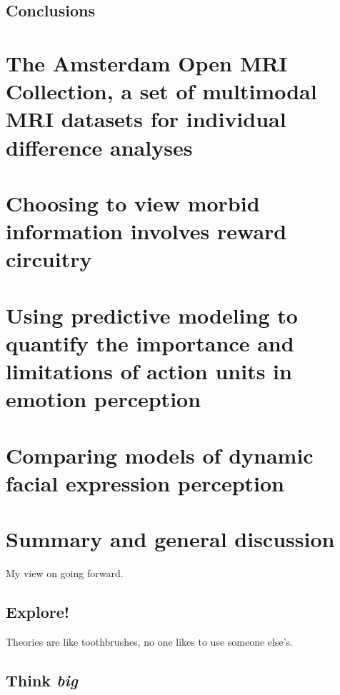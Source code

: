 \documentclass[12pt,american,a4paper,oneside,]{memoir} %
\begin{document}
\hypertarget{conclusions}{%
\section{Conclusions}\label{conclusions}}

\hypertarget{AOMIC}{%
\chapter{The Amsterdam Open MRI Collection, a set of multimodal MRI datasets for individual difference analyses}\label{AOMIC}}

\hypertarget{morbid-curiosity}{%
\chapter{Choosing to view morbid information involves reward circuitry}\label{morbid-curiosity}}

\hypertarget{au-limitations}{%
\chapter{Using predictive modeling to quantify the importance and limitations of action units in emotion perception}\label{au-limitations}}

\hypertarget{facial-expression-models}{%
\chapter{Comparing models of dynamic facial expression perception}\label{facial-expression-models}}

\hypertarget{summary-and-general-discussion}{%
\chapter{Summary and general discussion}\label{summary-and-general-discussion}}

My view on going forward.

\hypertarget{explore}{%
\section{Explore!}\label{explore}}

Theories are like toothbrushes, no one likes to use someone else's.

\hypertarget{think-big}{%
\section{\texorpdfstring{Think \emph{big}}{Think big}}\label{think-big}}
\end{document}
